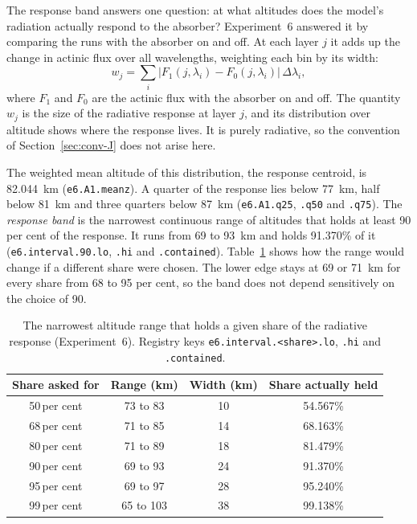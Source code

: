 The response band answers one question: at what altitudes does the model's radiation
actually respond to the absorber? Experiment~6 answered it by comparing the runs with
the absorber on and off. At each layer $j$ it adds up the change in actinic flux over
all wavelengths, weighting each bin by its width:
\begin{equation}
  w_j = \sum_{i} \big|F_{1}(j,\lambda_i) - F_{0}(j,\lambda_i)\big|\,\Delta\lambda_i ,
  \label{eq:weight}
\end{equation}
where $F_1$ and $F_0$ are the actinic flux with the absorber on and off. The quantity
$w_j$ is the size of the radiative response at layer $j$, and its distribution over
altitude shows where the response lives. It is purely radiative, so the convention of
Section~\ref{sec:conv-J} does not arise here.

The weighted mean altitude of this distribution, the response centroid, is 82.044~km
(\texttt{e6.A1.meanz}). A quarter of the response lies below 77~km, half below 81~km and
three quarters below 87~km (\texttt{e6.A1.q25}, \texttt{.q50} and \texttt{.q75}). The
\emph{response band} is the narrowest continuous range of altitudes that holds at least
90 per cent of the response. It runs from 69 to 93~km and holds 91.370\% of it
(\texttt{e6.interval.90.lo}, \texttt{.hi} and \texttt{.contained}). Table~\ref{tab:band}
shows how the range would change if a different share were chosen. The lower edge stays
at 69 or 71~km for every share from 68 to 95 per cent, so the band does not depend
sensitively on the choice of 90.

\begin{table}[htbp]
  \centering
  \caption[The narrowest altitude range that holds a given share of the radiative response (Experiment~6)]{The narrowest altitude range that holds a given share of the radiative
    response (Experiment~6). Registry keys \texttt{e6.interval.<share>.lo}, \texttt{.hi}
    and \texttt{.contained}.}
  \label{tab:band}
  \footnotesize
  \begin{tabular}{cccc}
    \toprule
    Share asked for & Range (km) & Width (km) & Share actually held \\
    \midrule
    50\,per cent & 73 to 83 & 10 & 54.567\% \\
    68\,per cent & 71 to 85 & 14 & 68.163\% \\
    80\,per cent & 71 to 89 & 18 & 81.479\% \\
    90\,per cent & 69 to 93 & 24 & 91.370\% \\
    95\,per cent & 69 to 97 & 28 & 95.240\% \\
    99\,per cent & 65 to 103 & 38 & 99.138\% \\
    \bottomrule
  \end{tabular}
\end{table}

